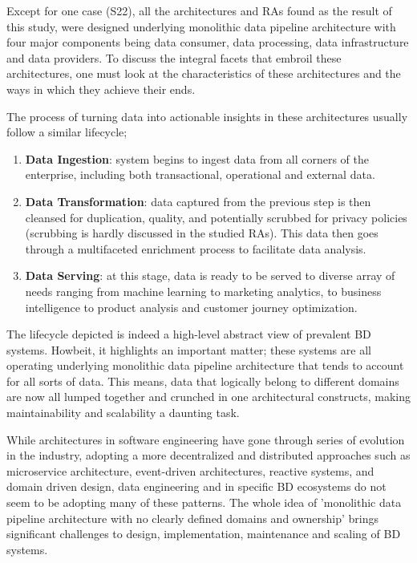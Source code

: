 \documentclass{ieeeaccess}
\begin{document}
Except for one case (S22), all the architectures and RAs found as the result of this study, were designed underlying monolithic data pipeline architecture with four major components being data consumer, data processing, data infrastructure and data providers. To discuss the integral facets that embroil these architectures, one must look at the characteristics of these architectures and the ways in which they achieve their ends.

The process of turning data into actionable insights in these architectures usually follow a similar lifecycle;

\begin{enumerate}
    \item \textbf{Data Ingestion}: system begins to ingest data from all corners of the enterprise, including both transactional, operational and external data.
    \item \textbf{Data Transformation}: data captured from the previous step is then cleansed for duplication, quality, and potentially scrubbed for privacy policies (scrubbing is hardly discussed in the studied RAs). This data then goes through a multifaceted enrichment process to facilitate data analysis.
    \item \textbf{Data Serving}: at this stage, data is ready to be served to diverse array of needs ranging from machine learning to marketing analytics, to business intelligence to product analysis and customer journey optimization.
\end{enumerate}

The lifecycle depicted is indeed a high-level abstract view of prevalent BD systems. Howbeit, it highlights an important matter; these systems are all operating underlying monolithic data pipeline architecture that tends to account for all sorts of data. This means, data that logically belong to different domains are now all lumped together and crunched in one architectural constructs, making maintainability and scalability a daunting task.

While architectures in software engineering have gone through series of evolution in the industry, adopting a more decentralized and distributed approaches such as microservice architecture, event-driven architectures, reactive systems, and domain driven design, data engineering and in specific BD ecosystems do not seem to be adopting many of these patterns. The whole idea of 'monolithic data
pipeline architecture with no clearly defined domains and ownership' brings significant challenges to design, implementation, maintenance and scaling of BD systems.
\end{document}
